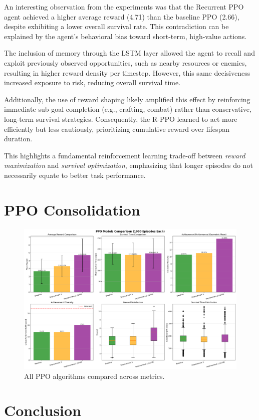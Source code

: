 \documentclass[twocolumn]{article}
\begin{document}
An interesting observation from the experiments was that the Recurrent PPO  agent achieved a higher average reward (4.71) than the baseline PPO (2.66), despite exhibiting a lower overall survival rate. This contradiction can be explained by the agent's behavioral bias toward short-term, high-value actions.

The inclusion of memory through the LSTM layer allowed the agent to recall and exploit previously observed opportunities, such as nearby resources or enemies, resulting in higher reward density per timestep. However, this same decisiveness increased exposure to risk, reducing overall survival time.

Additionally, the use of reward shaping likely amplified this effect by reinforcing immediate sub-goal completion (e.g., crafting, combat) rather than conservative, long-term survival strategies. Consequently, the R-PPO learned to act more efficiently but less cautiously, prioritizing cumulative reward over lifespan duration.

This highlights a fundamental reinforcement learning trade-off between \textit{reward maximization} and \textit{survival optimization}, emphasizing that longer episodes do not necessarily equate to better task performance.

\section*{PPO Consolidation}
\begin{figure}[H]
    \centering
    \includegraphics[width=0.75\linewidth]{images/final_comparison_1000_episodes.png}
    \caption{All PPO algorithms compared across metrics.}
    \label{fig:placeholder}
\end{figure}

\section*{Conclusion}
\end{document}
